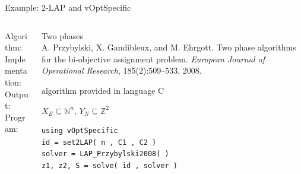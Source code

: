 \documentclass[10pt,xcolor=dvipsnames]{beamer}
\newcommand{\mN}{\mathbb{N}}
\newcommand{\Z}{\mathbb{Z}}
\begin{document}
\begin{frame}[fragile=singleslide]{Example: 2-LAP and vOptSpecific}

\vspace{5mm}
\begin{columns}
%
\begin{column}{0.2\textwidth}
Algorithm: \\
\vspace{15mm}
Implementation:\\  
\vspace{2mm}
Output: \\
\vspace{8mm}
Program:
\vspace{11mm}
\end{column}
\begin{column}{0.8\textwidth}
         Two phases  \vspace{1mm}\\
         {\footnotesize A. Przybylski, X. Gandibleux, and M. Ehrgott. Two phase algorithms for the bi-objective assignment problem.
         \textit{European Journal of Operational Research}, 185(2):509--533, 2008.\\}
\medskip

         algorithm provided in language C
\medskip

$X_E \subseteq \mN^n$, $Y_N \subseteq \Z^2$
\vspace{5mm}

{\footnotesize
\begin{verbatim}
using vOptSpecific   
id = set2LAP( n , C1 , C2 )
solver = LAP_Przybylski2008( ) 
z1, z2, S = solve( id , solver ) 
\end{verbatim}
}          
\end{column}
%
\end{columns}         

\end{frame}
\end{document}
